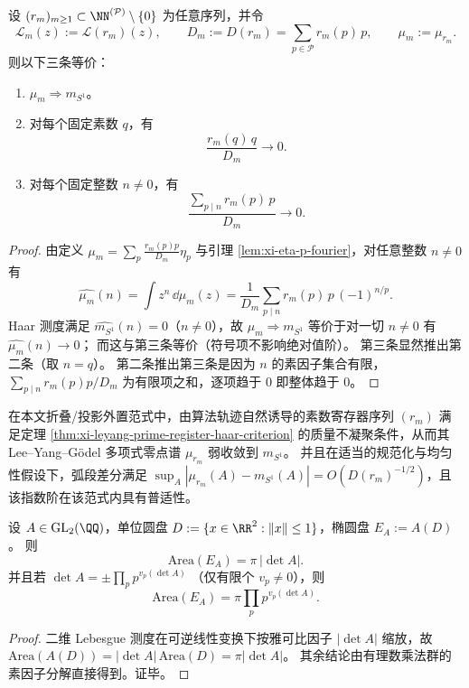 \begin{theorem}\label{thm:xi-leyang-prime-register-haar-criterion}
设 \((r_m)_{m\ge 1}\subset \NN^{(\mathcal P)}\setminus\{0\}\) 为任意序列，并令
\[
\mathcal L_m(z):=\mathcal L(r_m)(z),
\qquad
D_m:=D(r_m)=\sum_{p\in\mathcal P}r_m(p)\,p,
\qquad
\mu_m:=\mu_{r_m}.
\]
则以下三条等价：
\begin{enumerate}
  \item \(\mu_m\Rightarrow m_{S^1}\)。
  \item 对每个固定素数 \(q\)，有
  \[
  \frac{r_m(q)\,q}{D_m}\longrightarrow 0.
  \]
  \item 对每个固定整数 \(n\neq 0\)，有
  \[
  \frac{\sum_{p\mid n}r_m(p)\,p}{D_m}\longrightarrow 0.
  \]
\end{enumerate}
\end{theorem}
\begin{proof}
由定义 \(\mu_m=\sum_p \frac{r_m(p)p}{D_m}\eta_p\) 与引理 \ref{lem:xi-eta-p-fourier}，对任意整数 \(n\neq 0\) 有
\[
\widehat{\mu_m}(n)
=\int z^n\,\dd\mu_m(z)
=\frac1{D_m}\sum_{p\mid n}r_m(p)\,p\,(-1)^{n/p}.
\]
Haar 测度满足 \(\widehat{m_{S^1}}(n)=0\)（\(n\neq 0\)），故 \(\mu_m\Rightarrow m_{S^1}\) 等价于对一切 \(n\neq 0\) 有 \(\widehat{\mu_m}(n)\to 0\)；
而这与第三条等价（符号项不影响绝对值阶）。
第三条显然推出第二条（取 \(n=q\)）。
第二条推出第三条是因为 \(n\) 的素因子集合有限，\(\sum_{p\mid n}r_m(p)p/D_m\) 为有限项之和，逐项趋于 \(0\) 即整体趋于 \(0\)。
\end{proof}

\begin{conjecture}[外置诱导素数账本的质量不凝聚与普适差分阶]\label{conj:xi-leyang-prime-register-universal-nonconcentration}
在本文折叠/投影外置范式中，由算法轨迹自然诱导的素数寄存器序列 \((r_m)\) 满足定理 \ref{thm:xi-leyang-prime-register-haar-criterion} 的质量不凝聚条件，从而其 Lee--Yang--Gödel 多项式零点谱 \(\mu_{r_m}\) 弱收敛到 \(m_{S^1}\)。
并且在适当的规范化与均匀性假设下，弧段差分满足 \(\sup_A|\mu_{r_m}(A)-m_{S^1}(A)|=O(D(r_m)^{-1/2})\)，且该指数阶在该范式内具有普适性。
\end{conjecture}



\begin{theorem}[行列式素因子分解给出的椭圆面积守恒律]\label{thm:xi-terminal-ellipse-area-euler-prime-law}
设 \(A\in\mathrm{GL}_2(\QQ)\)，单位圆盘 \(D:=\{x\in\RR^2:\|x\|\le 1\}\)，椭圆盘 \(E_A:=A(D)\)。
则
\[
\mathrm{Area}(E_A)=\pi\,|\det A|.
\]
并且若
\(
\det A=\pm\prod_p p^{v_p(\det A)}
\)
（仅有限个 \(v_p\neq 0\)），则
\[
\mathrm{Area}(E_A)=\pi\prod_p p^{v_p(\det A)}.
\]
\end{theorem}
\begin{proof}
二维 Lebesgue 测度在可逆线性变换下按雅可比因子 \( |\det A| \) 缩放，故
\(
\mathrm{Area}(A(D))=|\det A|\,\mathrm{Area}(D)=\pi|\det A|
\)。
其余结论由有理数乘法群的素因子分解直接得到。证毕。
\end{proof}

